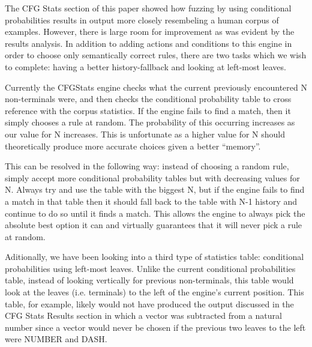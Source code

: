 The CFG Stats section of this paper showed how fuzzing by using conditional
probabilities results in output more closely resembeling a human corpus of
examples. However, there is large room for improvement as was evident by the
results analysis. In addition to adding actions and conditions to this engine
in order to choose only semantically correct rules, there are two tasks which
we wish to complete: having a better history-fallback and looking at left-most
leaves.

Currently the CFGStats engine checks what the current previously encountered N
non-terminals were, and then checks the conditional probability table to cross
reference with the corpus statistics. If the engine fails to find a match, then
it simply chooses a rule at random. The probability of this occurring increases
as our value for N increases. This is unfortunate as a higher value for N
should theoretically produce more accurate choices given a better ``memory''.

This can be resolved in the following way: instead of choosing a random rule,
simply accept more conditional probability tables but with decreasing values
for N. Always try and use the table with the biggest N, but if the engine fails
to find a match in that table then it should fall back to the table with N-1
history and continue to do so until it finds a match. This allows the engine to
always pick the absolute best option it can and virtually guarantees that it
will never pick a rule at random.

Aditionally, we have been looking into a third type of statistics table:
conditional probabilities using left-most leaves. Unlike the current
conditional probabilities table, instead of looking vertically for previous
non-terminals, this table would look at the leaves (i.e. terminals) to the left
of the engine's current position. This table, for example, likely would not
have produced the output discussed in the CFG Stats Results section in which a
vector was subtracted from a natural number since a vector would never be
chosen if the previous two leaves to the left were NUMBER and DASH.

